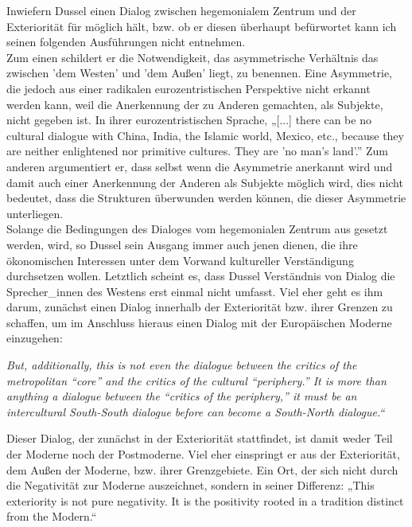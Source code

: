 Inwiefern Dussel einen Dialog zwischen hegemonialem Zentrum und der Exteriorität
für möglich hält, bzw. ob er diesen überhaupt befürwortet kann ich seinen
folgenden Ausführungen nicht entnehmen. \\
Zum einen schildert er die
Notwendigkeit, das asymmetrische Verhältnis das zwischen 'dem Westen' und 'dem
Außen' liegt, zu benennen. Eine Asymmetrie, die jedoch aus einer radikalen
eurozentristischen Perspektive nicht erkannt werden kann, weil die Anerkennung
der zu Anderen gemachten, als Subjekte, nicht gegeben ist. In ihrer
eurozentristischen Sprache,  „[...] there can be no cultural dialogue with
China, India, the Islamic world, Mexico, etc., because they are neither
enlightened nor primitive cultures. They are 'no man's land'.”\footnotemark
{} Zum anderen argumentiert er, dass selbst wenn die
Asymmetrie anerkannt wird und damit auch einer Anerkennung der Anderen als
Subjekte möglich wird, dies nicht bedeutet, dass die Strukturen überwunden
werden können, die dieser Asymmetrie unterliegen.\\
 Solange die Bedingungen des
Dialoges vom hegemonialen Zentrum aus gesetzt werden, wird, so Dussel sein
Ausgang immer auch jenen dienen, die ihre ökonomischen Interessen unter dem
Vorwand kultureller Verständigung durchsetzen wollen.\footnotemark
{} Letztlich scheint es, dass Dussel Verständnis von Dialog die
Sprecher\_innen des Westens erst einmal nicht umfasst. Viel eher geht es ihm
darum, zunächst einen Dialog innerhalb der Exteriorität bzw. ihrer Grenzen zu
schaffen, um im Anschluss hieraus einen Dialog mit der Europäischen Moderne
einzugehen:
\begin{myenv}
    \textit{But, additionally, this is not even the dialogue between the critics of the metropolitan “core” and the critics of the cultural “periphery.” It is more than anything a dialogue between the “critics of the periphery,” it must be an intercultural South-South dialogue before can become a South-North dialogue.“\footnotemark {}}
\end{myenv}
Dieser Dialog, der zunächst in der Exteriorität stattfindet, ist damit weder
Teil der Moderne noch der Postmoderne. Viel eher einspringt er aus der
Exteriorität, dem Außen der Moderne, bzw. ihrer Grenzgebiete. Ein Ort, der sich
nicht durch die Negativität zur Moderne auszeichnet, sondern in seiner
Differenz: „This exteriority is not pure negativity. It is the positivity rooted
in a tradition distinct from the Modern.“\footnotemark {}\\

